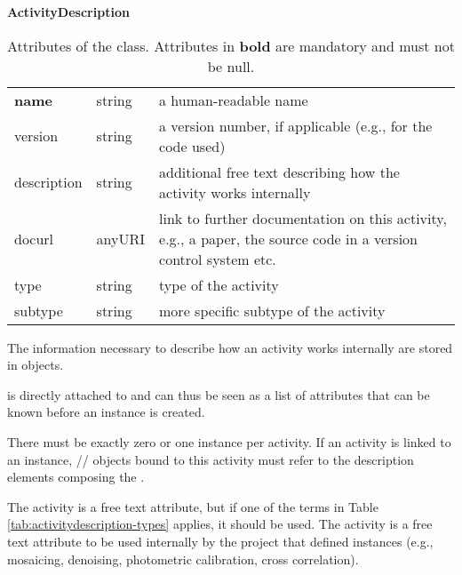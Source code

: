 \begin{table}[ht]
\small
{}\textwidth
\textbf{\normalsize ActivityDescription}\vspace{0.25em}\\
\begin{tabulary}{1.0\textwidth}{llL}
\toprule
{} &   & \\
\midrule
\textbf{name}         & string & a human-readable name\\
version      & string & a version number, if applicable (e.g., for the code used)\\
description  & string & additional free text describing how the activity works internally\\
docurl       & anyURI & link to further documentation on this activity, e.g., a
paper, the source code in a version control system etc.\\
type        & string & type of the activity\\
subtype     & string & more specific subtype of the activity\\
\bottomrule
\end{tabulary}
\caption[Attributes of the  class]{Attributes of the  class. Attributes in \textbf{bold} are mandatory and must not be null.
}\label{tab:activitydescription}
\end{table}


The information necessary to describe how an activity works internally are stored in  objects.

 is directly attached to  and can thus be seen as a list of attributes that can be known before an  instance is created.

There must be exactly zero or one  instance per activity.
If an activity is linked to an  instance, // objects bound to this activity must refer to the description elements composing the .

The activity  is a free text attribute, but if one of the terms in Table \ref{tab:activitydescription-types} applies, it should be used.
The activity  is a free text attribute to be used internally by the project that defined  instances (e.g., mosaicing, denoising, photometric calibration, cross correlation).


